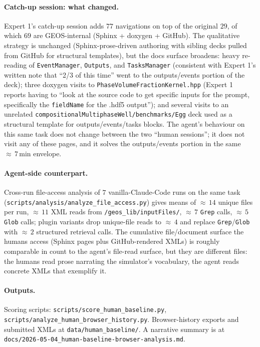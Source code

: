 \documentclass{article}
\begin{document}
\paragraph{Catch-up session: what changed.} Expert 1's catch-up session adds $77$ navigations on top of the original $29$, of which $69$ are GEOS-internal (Sphinx + doxygen + GitHub). The qualitative strategy is unchanged (Sphinx-prose-driven authoring with sibling decks pulled from GitHub for structural templates), but the docs surface broadens: heavy re-reading of \texttt{EventManager}, \texttt{Outputs}, and \texttt{TasksManager} (consistent with Expert 1's written note that ``2/3 of this time'' went to the outputs/events portion of the deck); three doxygen visits to \texttt{PhaseVolumeFractionKernel.hpp} (Expert 1 reports having to ``look at the source code to get specific inputs for the prompt, specifically the \texttt{fieldName} for the .hdf5 output''); and several visits to an unrelated \texttt{compositionalMultiphaseWell/benchmarks/Egg} deck used as a structural template for outputs/events/tasks blocks. The agent's behaviour on this same task does not change between the two ``human sessions''; it does not visit any of these pages, and it solves the outputs/events portion in the same ${\approx}\,7\,$min envelope.

\paragraph{Agent-side counterpart.} Cross-run file-access analysis of $7$ vanilla-Claude-Code runs on the same task (\texttt{scripts/analysis/analyze\_file\_access.py}) gives means of ${\approx}\,14$ unique files per run, ${\approx}\,11$ XML reads from \texttt{/geos\_lib/inputFiles/}, ${\approx}\,7$ \texttt{Grep} calls, ${\approx}\,5$ \texttt{Glob} calls; plugin variants drop unique-file reads to ${\approx}\,4$ and replace \texttt{Grep}/\texttt{Glob} with ${\approx}\,2$ structured retrieval calls. The cumulative file/document surface the humans access (Sphinx pages plus GitHub-rendered XMLs) is roughly comparable in count to the agent's file-read surface, but they are different files: the humans read prose narrating the simulator's vocabulary, the agent reads concrete XMLs that exemplify it.

\paragraph{Outputs.} Scoring scripts: \texttt{scripts/score\_human\_baseline.py}, \texttt{scripts/analyze\_human\_browser\_history.py}. Browser-history exports and submitted XMLs at \texttt{data/human\_baseline/}. A narrative summary is at \texttt{docs/2026-05-04\_human-baseline-browser-analysis.md}.
\end{document}
